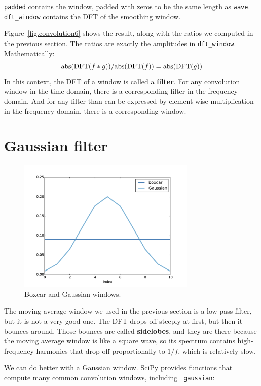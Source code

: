 \documentclass[12pt]{book}
\begin{document}
{\tt padded} contains the window, padded with zeros to be the
same length as {\tt wave}.  \verb"dft_window" contains the
DFT of the smoothing window.

\newcommand{\abs}{\mathrm{abs}}

Figure~\ref{fig.convolution6} shows the result, along with the
ratios we computed in the previous section.  The ratios are
exactly the amplitudes in \verb"dft_window".  Mathematically:
%
\[ \abs(\DFT(f \conv g)) / \abs(\DFT(f)) = \abs(\DFT(g)) \]
%
In this context, the DFT of a window is called a {\bf filter}.
For any convolution window in the time domain, there is a
corresponding filter in the frequency domain.  And for any
filter than can be expressed by element-wise multiplication in
the frequency domain, there is a corresponding window.


\section{Gaussian filter}

\begin{figure}
\centerline{\includegraphics[height=2.5in]{figs/convolution7.pdf}}
\caption{Boxcar and Gaussian windows.}
\label{fig.convolution7}
\end{figure}

The moving average window we used in the previous section is a
low-pass filter, but it is not a very good one.  The DFT drops off
steeply at first, but then it bounces around.  Those bounces are
called {\bf sidelobes}, and they are there because the moving average
window is like a square wave, so its spectrum contains high-frequency
harmonics that drop off proportionally to $1/f$, which is relatively
slow.

We can do better with a Gaussian window.  SciPy provides functions
that compute many common convolution windows, including {\tt
  gaussian}:
\end{document}
